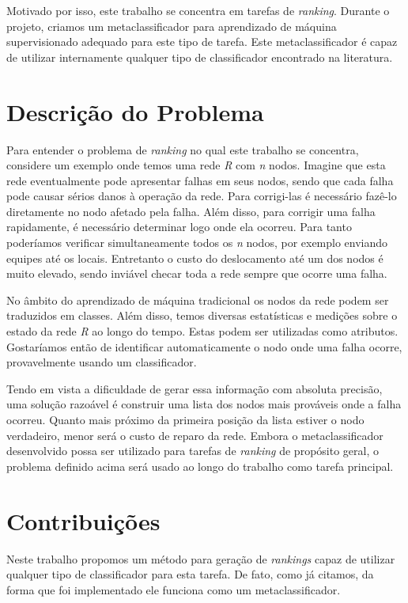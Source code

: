 Motivado por isso, este trabalho se concentra em tarefas de \textit{ranking}.
Durante o projeto, criamos um metaclassificador para aprendizado de máquina supervisionado adequado para este tipo de tarefa.
Este metaclassificador é capaz de utilizar internamente qualquer tipo de classificador encontrado na literatura.

\section{Descrição do Problema}

Para entender o problema de \textit{ranking} no qual este trabalho se concentra, considere um exemplo onde temos uma rede \textit{R} com \textit{n} nodos.
Imagine que esta rede eventualmente pode apresentar falhas em seus nodos, sendo que cada falha pode causar sérios danos à operação da rede.
Para corrigi-las é necessário fazê-lo diretamente no nodo afetado pela falha.
Além disso, para corrigir uma falha rapidamente, é necessário determinar logo onde ela ocorreu.
Para tanto poderíamos verificar simultaneamente todos os \textit{n} nodos, por exemplo enviando equipes até os locais.
Entretanto o custo do deslocamento até um dos nodos é muito elevado, sendo inviável checar toda a rede sempre que ocorre uma falha.

No âmbito do aprendizado de máquina tradicional os nodos da rede podem ser traduzidos em classes.
Além disso, temos diversas estatísticas e medições sobre o estado da rede \textit{R} ao longo do tempo.
Estas podem ser utilizadas como atributos.
Gostaríamos então de identificar automaticamente o nodo onde uma falha ocorre, provavelmente usando um classificador.

Tendo em vista a dificuldade de gerar essa informação com absoluta precisão, uma solução razoável é construir uma lista dos nodos mais prováveis onde a falha ocorreu.
Quanto mais próximo da primeira posição da lista estiver o nodo verdadeiro, menor será o custo de reparo da rede.
Embora o metaclassificador desenvolvido possa ser utilizado para tarefas de \textit{ranking} de propósito geral, o problema definido acima será usado ao longo do trabalho como tarefa principal.

\section{Contribuições}

Neste trabalho propomos um método para geração de \textit{rankings} capaz de utilizar qualquer tipo de classificador para esta tarefa.
De fato, como já citamos, da forma que foi implementado ele funciona como um metaclassificador.

